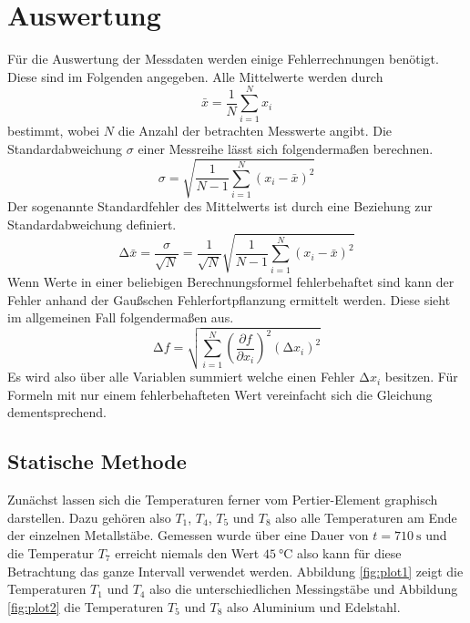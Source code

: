 \section{Auswertung}
Für die Auswertung der Messdaten werden einige Fehlerrechnungen benötigt. Diese sind im Folgenden angegeben.
Alle Mittelwerte werden durch
\begin{equation}
    \label{eqn:mittel}
\bar{x} = \frac{1}{N} \sum_{i=1}^{N} x_{i}
\end{equation}
bestimmt, wobei $N$ die Anzahl der betrachten Messwerte angibt. Die Standardabweichung $\sigma$ einer Messreihe lässt sich folgendermaßen berechnen.
\begin{equation}
\sigma = \sqrt{\frac{1}{N-1}\sum_{i=1}^{N} (x_{i} -\bar{x})^2 }
\end{equation}
Der sogenannte Standardfehler des Mittelwerts ist durch eine Beziehung zur Standardabweichung definiert.
\begin{equation}
    \label{eqn:sem}
\increment \bar{x} = \frac{\sigma}{\sqrt{N}} = \frac{1}{\sqrt{N}} \sqrt{\frac{1}{N-1}\sum_{i=1}^{N} (x_{i} -\bar{x})^2 }
\end{equation}
Wenn Werte in einer beliebigen Berechnungsformel fehlerbehaftet sind kann der Fehler anhand der Gaußschen Fehlerfortpflanzung ermittelt werden. Diese sieht im allgemeinen Fall folgendermaßen aus.
\begin{equation}
    \label{eqn:gauss}
\increment f = \sqrt{\sum_{i=1}^{N} \left( \frac{\partial f}{\partial x_{i}}\right)^2 (\increment x_{i})^2}
\end{equation}
Es wird also über alle Variablen summiert welche einen Fehler $\increment x_{i}$ besitzen. Für Formeln mit nur einem fehlerbehafteten Wert vereinfacht sich die Gleichung dementsprechend.

\subsection{Statische Methode}
Zunächst lassen sich die Temperaturen ferner vom Pertier-Element graphisch darstellen. Dazu gehören also $T_{1}$, $T_{4}$, $T_{5}$ und $T_{8}$ also alle Temperaturen am Ende der einzelnen Metallstäbe.
Gemessen wurde über eine Dauer von $t = \SI{710}{\second}$ und die Temperatur $T_{7}$ erreicht niemals den Wert $\SI{45}{\celsius}$ also kann für diese Betrachtung das ganze Intervall verwendet werden.
Abbildung \ref{fig:plot1} zeigt die Temperaturen $T_{1}$ und $T_{4}$ also die unterschiedlichen Messingstäbe und Abbildung \ref{fig:plot2} die Temperaturen $T_{5}$ und $T_{8}$ also Aluminium und Edelstahl.

